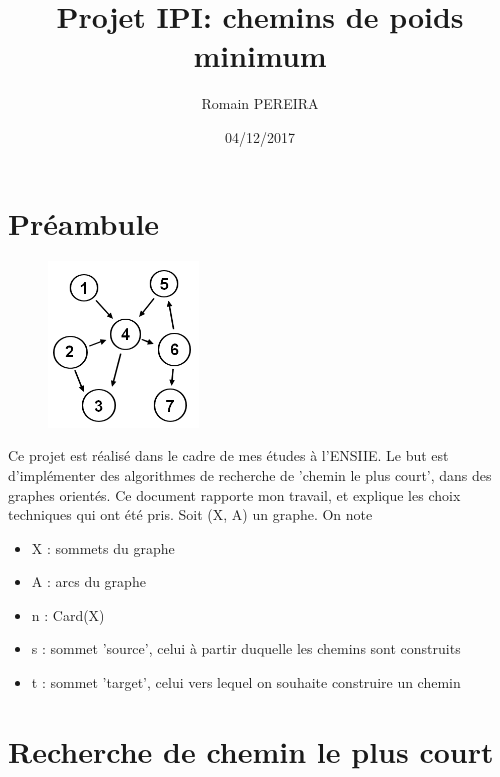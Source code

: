 \documentclass[10pt]{article}
\title{Projet IPI: chemins de poids minimum}
\author{Romain PEREIRA}
\date{04/12/2017}
\begin{document}
	\maketitle
	\tableofcontents

	\section*{Préambule}
	
		\begin{figure}
			\includegraphics[width=4cm]{./images/graph.png}
		\end{figure}

		Ce projet est réalisé dans le cadre de mes études à l'ENSIIE.\newline
		Le but est d'implémenter des algorithmes de recherche de 'chemin le plus court', dans des graphes orientés.\newline
		Ce document rapporte mon travail, et explique les choix techniques qui ont été pris.
		Soit (X, A) un graphe. On note
		\begin{itemize}[label=-]
			\item X : sommets du graphe
			\item A : arcs du graphe
			\item n : Card(X)
			\item s : sommet 'source', celui à partir duquelle les chemins sont construits
			\item t : sommet 'target', celui vers lequel on souhaite construire un chemin
		\end{itemize}
		
		
	\newpage
	\section{Recherche de chemin le plus court}
\end{document}
